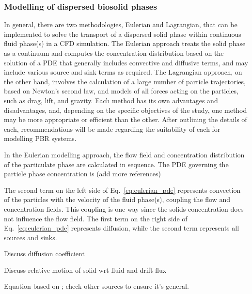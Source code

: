 \subsubsection{Modelling of dispersed biosolid phases}
\label{S:21}

In general, there are two methodologies, Eulerian and Lagrangian, that can be implemented to solve the transport of a dispersed solid phase within continuous fluid phase(s) in a CFD simulation. The Eulerian approach treats the solid phase as a continuum and computes the concentration distribution based on the solution of a PDE that generally includes convective and diffusive terms, and may include various source and sink terms as required.  The Lagrangian approach, on the other hand, involves the calculation of a large number of particle trajectories, based on Newton's second law, and models of all forces acting on the particles, such as drag, lift, and gravity. Each method has its own advantages and disadvantages, and, depending on the specific objectives of the study, one method may be more appropriate or efficient than the other.  After outlining the details of each, recommendations will be made regarding the suitability of each for modelling PBR systems.

In the Eulerian modelling approach, the flow field and concentration distribution of the particulate phase are calculated in sequence.  The PDE governing the particle phase concentration is \cite{Zhang2007} (add more references)




The second term on the left side of Eq.\ \ref{eq:eulerian_pde} represents convection of the particles with the velocity of the fluid phase(s), coupling the flow and concentration fields.  This coupling is one-way since the solids concentration does not influence the flow field.  The first term on the right side of Eq.\ \ref{eq:eulerian_pde} represents diffusion, while the second term represents all sources and sinks.

Discuss diffusion coefficient

Discuss relative motion of solid wrt fluid and drift flux

Equation based on \cite{Zhang2007}; check other sources to ensure it's general.
%


